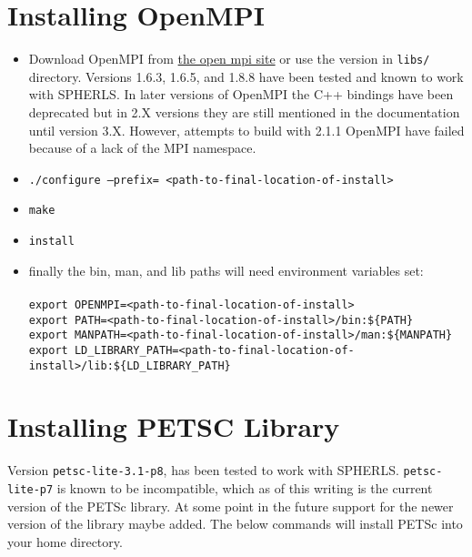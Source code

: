 \documentclass[12pt,a4paper]{book}
\begin{document}
\section{Installing OpenMPI}
\begin{itemize}
\item Download OpenMPI from \href{http://www.open-mpi.org/software/ompi/v1.6/}{the open mpi site} or use the version in {\tt libs/} directory. Versions 1.6.3, 1.6.5, and 1.8.8 have been tested and known to work with SPHERLS. In later versions of OpenMPI the C++ bindings have been deprecated but in 2.X versions they are still mentioned in the documentation until version 3.X. However, attempts to build with 2.1.1 OpenMPI have failed because of a lack of the MPI namespace.

\item {\tt ./configure --prefix=\- <path-to-final-location-of-install>}
\item {\tt make}
\item {\tt install}
\item finally the bin, man, and lib paths will need environment variables set:\\
 \\

{\tt export OPENMPI\-=<path-to-final-location-of-install>}\\
{\tt export PATH\-=<path-to-final-location-of-install>/bin:\-\$\{PATH\}}\\
{\tt export MANPATH\-=<path-to-final-location-of-install>/man:\-\$\{MANPATH\}}\\
{\tt export LD\_LIBRARY\_PATH\-=<path-to-final-location-of-install>/lib\-:\$\{LD\_LIBRARY\_PATH\}}\\

\end{itemize}

\section{Installing PETSC Library}
Version {\tt petsc\--lite-3.1-p8}, has been tested to work with SPHERLS. {\tt petsc\--lite\--p7} is known to be incompatible, which as of this writing is the current version of the PETSc library. At some point in the future support for the newer version of the library maybe added. The below commands will install PETSc into your home directory.
\end{document}
